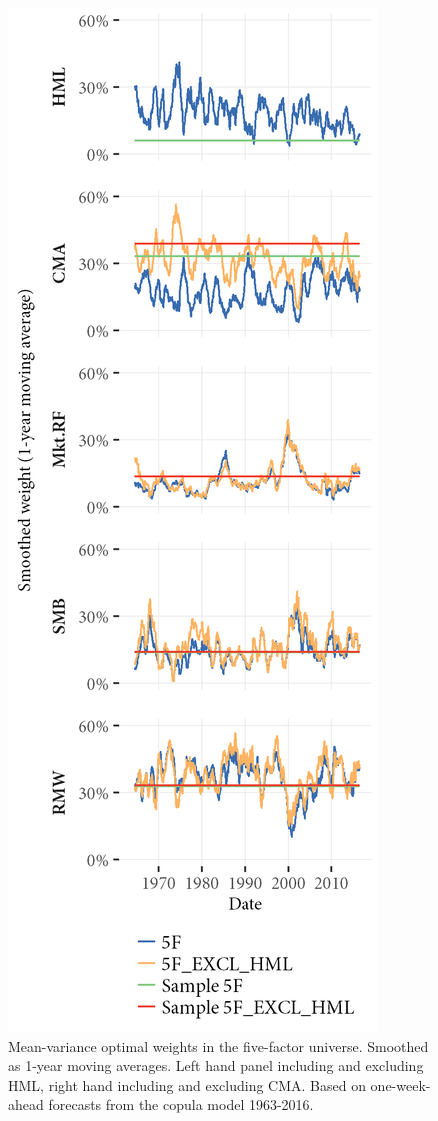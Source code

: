 \begin{figure}[htbp]
  \centering
  \footnotesize
  \renewcommand{\arraystretch}{1.2}
  \caption{Mean-variance optimal weights in the five-factor universe. Smoothed as 1-year moving averages. Left hand panel including and excluding HML, right hand including and excluding CMA. Based on one-week-ahead forecasts from the copula model 1963-2016.}
  \label{fig:mv_optimal_5}
  \includegraphics[scale = 1]{graphics/Weights_5F_EXCL_HML_5F.png}

\end{figure}
